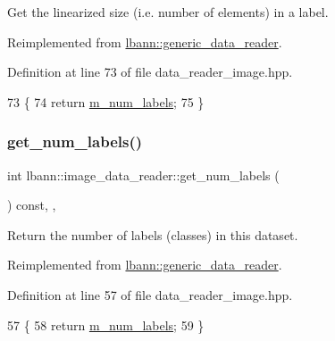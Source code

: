 Get the linearized size (i.\+e. number of elements) in a label. 



Reimplemented from \hyperlink{classlbann_1_1generic__data__reader_a99e8ba4f09fdc86d238ad7c8d2e2bce0}{lbann\+::generic\+\_\+data\+\_\+reader}.



Definition at line 73 of file data\+\_\+reader\+\_\+image.\+hpp.


\begin{DoxyCode}
73                                                  \{
74     \textcolor{keywordflow}{return} \hyperlink{classlbann_1_1image__data__reader_af280e8758a6ec3acee7c62e6351d17e0}{m\_num\_labels};
75   \}
\end{DoxyCode}
\mbox{\label{classlbann_1_1image__data__reader_af821795e5104f1a8c34027de96af7b90}} 
\subsubsection{\texorpdfstring{get\+\_\+num\+\_\+labels()}{get\_num\_labels()}}
{\footnotesize\ttfamily int lbann\+::image\+\_\+data\+\_\+reader\+::get\+\_\+num\+\_\+labels (\begin{DoxyParamCaption}{ }\end{DoxyParamCaption}) const\hspace{0.3cm}{\ttfamily [inline]}, {\ttfamily [override]}, {\ttfamily [virtual]}}



Return the number of labels (classes) in this dataset. 



Reimplemented from \hyperlink{classlbann_1_1generic__data__reader_a935ce6262d75f1834e550c3bc16a6547}{lbann\+::generic\+\_\+data\+\_\+reader}.



Definition at line 57 of file data\+\_\+reader\+\_\+image.\+hpp.


\begin{DoxyCode}
57                                       \{
58     \textcolor{keywordflow}{return} \hyperlink{classlbann_1_1image__data__reader_af280e8758a6ec3acee7c62e6351d17e0}{m\_num\_labels};
59   \}
\end{DoxyCode}
\mbox{\label{classlbann_1_1image__data__reader_ae3f4a0b018e8212a42cbbfbd2b514bf4}} 

